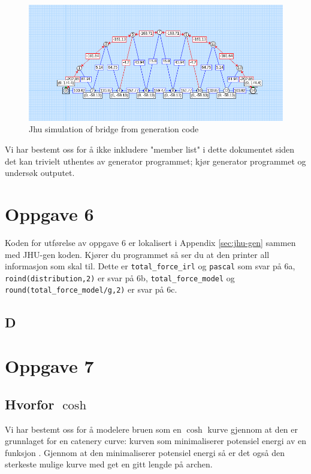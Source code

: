 \documentclass{report}
\begin{document}
\begin{figure}[H]
	\centering
	\includegraphics [width=.8\linewidth]{jhu}
	\caption{Jhu simulation of bridge from generation code}
	\label{fig:jhu}
\end{figure}

Vi har bestemt oss for å ikke inkludere "member list" i dette dokumentet siden det kan trivielt uthentes av generator programmet; kjør generator programmet og undersøk outputet.

\section{Oppgave 6}

\label{sec:f-calc}

Koden for utførelse av oppgave 6 er lokalisert i Appendix \ref{sec:jhu-gen} sammen med JHU-gen koden. Kjører du programmet så ser du at den printer all informasjon som skal til. Dette er \lstinline{total_force_irl} og \lstinline{pascal} som svar på 6a, \lstinline{roind(distribution,2)} er svar på 6b, \lstinline{total_force_model} og \lstinline{round(total_force_model/g,2)} er svar på 6c.

\subsection{D}



\section{Oppgave 7}

\subsection {Hvorfor $\cosh$}

Vi har bestemt oss for å modelere bruen som en $\cosh$ kurve gjennom at den er grunnlaget for en catenery curve: kurven som minimaliserer potensiel energi av en funksjon \cite{wiki:catenery}. Gjennom at den minimaliserer potensiel energi så er det også den sterkeste mulige kurve med get en gitt lengde på archen.
\end{document}
